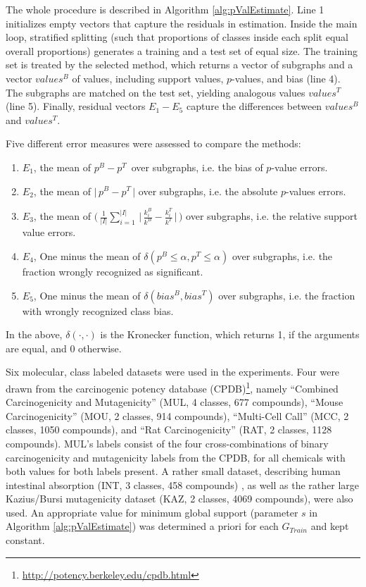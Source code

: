 \documentclass{sig-alternate}
\begin{document}
The whole procedure is described in Algorithm \ref{alg:pValEstimate}.
Line 1 initializes empty vectors that capture the residuals in estimation.
Inside the main loop, stratified splitting (such that proportions of classes
inside each split equal overall proportions) generates a training and a test
set of equal size. The training set is treated by the selected method, which
returns a vector of subgraphs and a vector $values^B$ of values,
including support values, $p$-values, and bias (line 4). The subgraphs are matched on
the test set, yielding analogous values $values^T$ (line 5). Finally, 
residual vectors $E_1-E_5$ capture the differences between $values^B$ and
$values^T$.

Five different
error measures were assessed to compare the methods:
\begin{enumerate}
  \item $E_1$, the mean of     $ p^B -p^T \,$                                                                                    over subgraphs, i.e. the bias of $p$-value errors.
  \item $E_2$, the mean of     $ \Big|\,p^B -p^T \,\Big|$                                                                        over subgraphs, i.e. the absolute $p$-values errors.
  \item $E_3$, the mean of     $ \Big(\,\frac{1}{|I|} \sum_{i=1}^{|I|} \,\Big|\,\frac{k^B_i}{k^B} - \frac{k^T_i}{k^T} \,\Big|\,\Big)$ over subgraphs, i.e. the relative support value errors.
  \item $E_4$, One minus the mean of $ \delta(p^B \le \alpha, p^T \le \alpha)$                                                         over subgraphs, i.e. the fraction wrongly recognized as significant.
  \item $E_5$, One minus the mean of $ \delta(bias^B, bias^T)$                                                                        over subgraphs, i.e. the fraction with wrongly recognized class bias.

\end{enumerate}
In the above, $\delta(\cdot,\cdot)$ is the Kronecker function, which returns 1, if the arguments are equal, and 0 otherwise.

Six molecular, class labeled datasets were used in the experiments. 
Four were drawn from the carcinogenic potency database
(CPDB)\footnote{\url{http://potency.berkeley.edu/cpdb.html}}, namely 
``Combined Carcinogenicity and Mutagenicity'' (MUL, 4 classes, 677 compounds),
``Mouse Carcinogenicity'' (MOU, 2 classes, 914 compounds), 
``Multi-Cell Call'' (MCC, 2 classes, 1050 compounds), and 
``Rat Carcinogenicity'' (RAT, 2 classes, 1128 compounds). 
MUL's labels consist of the four cross-combinations of binary carcinogenicity
and mutagenicity labels from the CPDB, for all chemicals with both values for
both labels present.
A rather small dataset, describing human intestinal absorption (INT, 3 classes,
458 compounds) \cite{Suenderhauf10Combinatorial}, as well as the rather large
Kazius/Bursi mutagenicity dataset (KAZ, 2 classes, 4069 compounds),
\cite{kazius05derivation} were also used. An appropriate value for minimum global
support (parameter $s$ in Algorithm \ref{alg:pValEstimate}) was determined a
priori for each $G_{Train}$ and kept constant.
\end{document}
